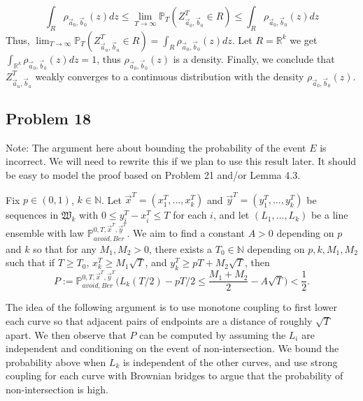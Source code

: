 \documentclass[12pt]{article}
\begin{document}
$$\int_{R}\rho_{\vec{a}_{0},\vec{b}_{0}}(z)dz \leqslant \lim_{T\rightarrow\infty}\mathbb{P}_{T}(Z^{T}_{\vec{a}_{0},\vec{b}_{0}}\in R)\leqslant\int_{R}\rho_{\vec{a}_{0},\vec{b}_{0}}(z)dz$$ Thus, $\lim_{T\rightarrow\infty}\mathbb{P}_{T}(Z^{T}_{\vec{a}_{u},\vec{b}_{u}}\in R)=\int_{R}\rho_{\vec{a}_{0},\vec{b}_{0}}(z)dz$. Let $R=\mathbb{R}^{k}$ we get $\int_{\mathbb{R}^{k}}\rho_{\vec{a}_{0},\vec{b}_{0}}(z)dz = 1$, thus $\rho_{\vec{a}_{0},\vec{b}_{0}}(z)$ is a density. Finally, we conclude that $Z^{T}_{\vec{a}_{u},\vec{b}_{u}}$ weakly converges to a continuous distribution with the density $\rho_{\vec{a}_{0},\vec{b}_{0}}(z)$.



\subsection*{Problem 18}

	Note: The argument here about bounding the probability of the event $E$ is incorrect. We will need to rewrite this if we plan to use this result later. It should be easy to model the proof based on Problem 21 and/or Lemma 4.3.

	Fix $p\in(0,1)$, $k\in\mathbb{N}$. Let $\vec{x}^T = (x_1^T,\dots,x_k^T)$ and $\vec{y}^T = (y_1^T,\dots,y_k^T)$ be sequences in $\mathfrak{W}_k$ with $0\leq y_i^T - x_i^T \leq T$ for each $i$, and let $(L_1,\dots,L_k)$ be a line ensemble with law $\mathbb{P}^{0,T,\vec{x}^T,\vec{y}^T}_{avoid, Ber}$.  We aim to find a constant $A>0$ depending on $p$ and $k$ so that for any $M_1, M_2 > 0$, there exists a $T_0 \in \mathbb{N}$ depending on $p,k,M_1,M_2$ such that if $T\geq T_0$, $x_k^T \geq M_1\sqrt{T}$, and $y_k^T \geq pT + M_2\sqrt{T}$, then
	\[
	P := \mathbb{P}^{0,T,\vec{x}^T,\vec{y}^T}_{avoid, Ber} \Big( L_k(T/2) - pT/2 \leq \frac{M_1+M_2}{2} - A\sqrt{T} \Big) < \frac{1}{2}.
	\]
	
	The idea of the following argument is to use monotone coupling to first lower each curve so that adjacent pairs of endpoints are a distance of roughly $\sqrt{T}$ apart. We then observe that $P$ can be computed by assuming the $L_i$ are independent and conditioning on the event of non-intersection. We bound the probability above when $L_k$ is independent of the other curves, and use strong coupling for each curve with Brownian bridges to argue that the probability of non-intersection is high.
	
\end{document}
